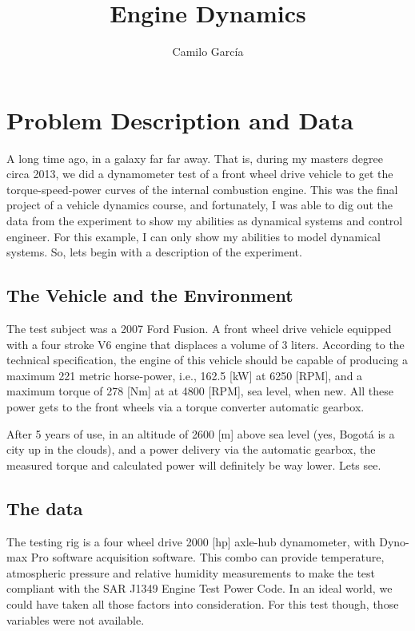 \documentclass{article}
\title{Engine Dynamics}
\author{Camilo Garc\'ia}
\begin{document}
\maketitle
\section{Problem Description and Data}\label{sec:Problem Description and Data} %
A long time ago, in a galaxy far far away. That is, during my masters degree circa 2013, we did a dynamometer test of a front wheel drive vehicle to get the torque-speed-power curves of the internal combustion engine. This was the final project of a vehicle dynamics course, and fortunately, I was able to dig out the data from the experiment to show my abilities as dynamical systems and control engineer. For this example, I can only show my abilities to model dynamical systems. So, lets begin with a description of the experiment.
\subsection{The Vehicle and the Environment}\label{sub:The Vehicle} %
The test subject was a 2007 Ford Fusion. A front wheel drive vehicle equipped with a four stroke V6 engine that displaces a volume of 3 liters. According to the technical specification, the engine of this vehicle should be capable of producing a maximum 221 metric horse-power, i.e., 162.5 [kW] at 6250 [RPM], and a maximum torque of 278 [Nm] at  at 4800 [RPM], sea level, when new. All these power gets to the front wheels via a torque converter automatic gearbox.

After 5 years of use, in an altitude of 2600 [m] above sea level (yes, Bogot\'a is a city up in the clouds), and a power delivery via the automatic gearbox, the measured torque and calculated power will definitely be way lower. Lets see.
\subsection{The data}\label{sub:The data} %
The testing rig is a four wheel drive 2000 [hp] axle-hub dynamometer, with Dyno-max Pro software acquisition software. This combo can provide temperature, atmospheric pressure and relative humidity measurements to make the test compliant with the SAR J1349 Engine Test Power Code. In an ideal world, we could have taken all those factors into consideration. For this test though, those variables were not available.
\end{document}
